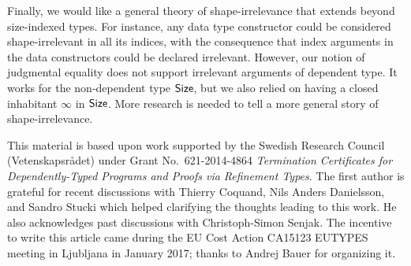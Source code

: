 \documentclass[acmsmall,screen]{acmart}\settopmatter{}
\newcommand{\SHORTVERSION}[1]{#1}
\begin{document}
Finally, we would like a general theory of shape-irrelevance that
extends beyond size-indexed types.  For instance, any data type
constructor could be considered shape-irrelevant in all its
indices, with the consequence that index arguments in the data constructors
could be declared irrelevant.
However, our notion of judgmental equality does not support
irrelevant arguments of dependent type.
It works for the non-dependent type $\mathsf{Size}$, but we also
relied on having a closed inhabitant $\infty$ in $\mathsf{Size}$.
More research is needed to tell a more general story of shape-irrelevance.







\begin{acks}                            %
  This material is based upon work supported by the
  Swedish Research Council (Vetenskapsr\aa{}det)
  under Grant
  No.~621-2014-4864 \emph{Termination Certificates for Dependently-Typed Programs and Proofs via Refinement Types}.
  The first author is grateful for recent discussions with Thierry Coquand, Nils Anders Danielsson, and Sandro Stucki
  which helped clarifying the thoughts leading to this work.
  He also acknowledges past discussions with Christoph-Simon Senjak.
  The incentive to write this article came during the EU Cost Action CA15123 EUTYPES meeting in Ljubljana in January 2017; thanks to Andrej Bauer for organizing it.
\end{acks}

\SHORTVERSION{\clearpage}





\end{document}
